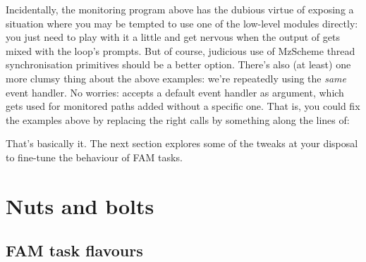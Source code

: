 Incidentally, the monitoring program above has the dubious virtue of
exposing a situation where you may be tempted to use one of the
low-level modules directly: you just need to play with it a little and
get nervous when the output of  gets mixed with the
loop's prompts. But of course, judicious use of MzScheme thread
synchronisation primitives should be a better option. There's also (at
least) one more clumsy thing about the above examples: we're
repeatedly using the \textit{same} event handler. No worries:
 accepts a default event handler as argument,
which gets used for monitored paths added without a specific one. That
is, you could fix the examples above by replacing the right calls by
something along the lines of:

That's basically it. The next section explores some of the tweaks at
your disposal to fine-tune the behaviour of FAM tasks.

\section{Nuts and bolts}
\label{sec:nuts-bolts}

\subsection{FAM task flavours}
\label{sec:fam-task-flavours}

